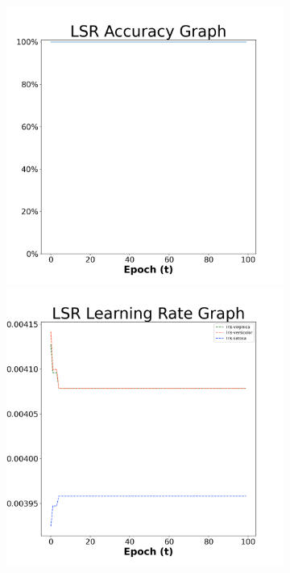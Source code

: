 \begin{figure}[H]
    \centering %
\begin{subfigure}{0.3\textwidth}
  \includegraphics[width=\linewidth]{images/exper1/iris/LSR_0.01_acc.png}
    \includegraphics[width=\linewidth]{images/exper1/iris/LSR_0.01_lr.png}

\end{subfigure}
\end{figure}
